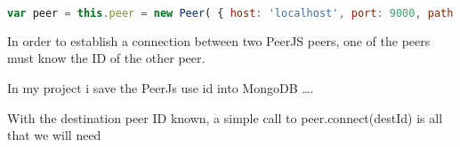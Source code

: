 \begin{lstlisting}[language=javascript]
var peer = this.peer = new Peer( { host: 'localhost', port: 9000, path: '/peerjs'});
\end{lstlisting}

In order to establish a connection between two PeerJS peers, one of the peers must know the ID of the other peer.

In my project i save the PeerJs use id into MongoDB ….


 With the destination peer ID known, a simple call to peer.connect(destId) is all that we will need
